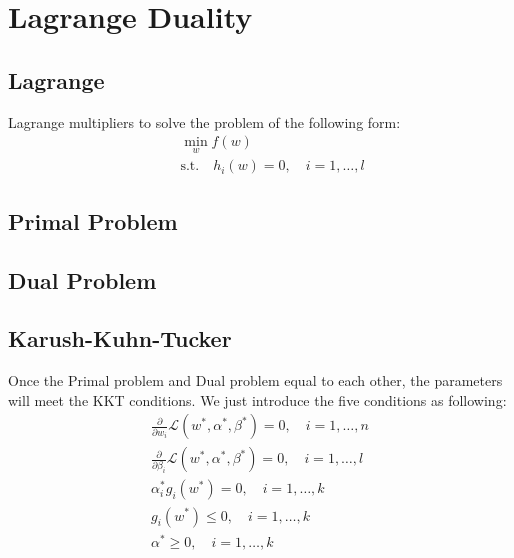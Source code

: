 \documentclass[a4paper]{article}
\begin{document}
\section{Lagrange Duality}
\subsection{Lagrange}
Lagrange multipliers to solve the problem of the following form:
\begin{align*}
&\quad \min_{w} f(w) \\
&\quad \text{s.t.} \quad  h_{i}(w) = 0, \quad i = 1, \dots,l
\end{align*}

\subsection{Primal Problem}

\subsection{Dual Problem}

\subsection{Karush-Kuhn-Tucker}
Once the Primal problem and Dual problem equal to each other, the parameters will meet the KKT conditions. We just introduce the five conditions as following:
\begin{align}
	\frac{\partial}{\partial w_i} \mathcal{L}(w^\ast, \alpha ^ \ast, \beta^\ast) = 0, \quad i = 1, \dots, n \\
	\frac{\partial}{\partial \beta_i} \mathcal{L}(w^\ast, \alpha ^ \ast, \beta^\ast) = 0, \quad i = 1, \dots, l \\
	\alpha_{i}^\ast g_i(w^\ast) = 0, \quad i = 1, \dots, k \\
	g_i(w^\ast) \leq 0, \quad i = 1, \dots, k \\
	\alpha^\ast \geq 0, \quad i = 1, \dots, k 
\end{align}
\end{document}
